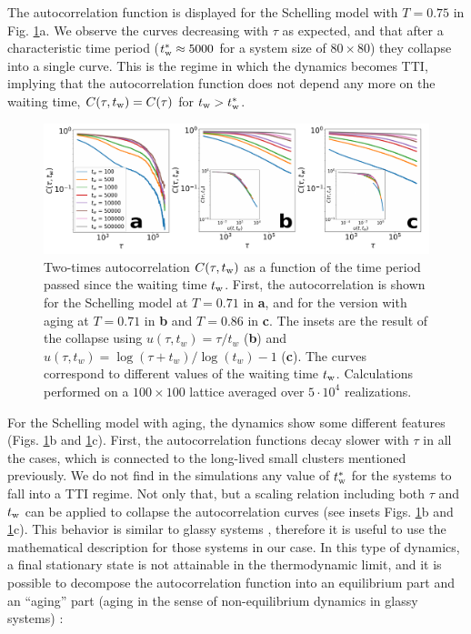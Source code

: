 The autocorrelation function is displayed for the Schelling model with $T = 0.75$ in Fig. \ref{Fig5}a. We observe the curves decreasing with $\tau$ as expected, and that after a characteristic time period ($t_{\rm{w}}^* \approx 5000$ for a system size of $80\times 80$) they collapse into a single curve. This is the regime in which the dynamics becomes TTI, implying that the autocorrelation function does not depend any more on the waiting time, $C(\tau,t_{\rm{w}}) = C(\tau)$ for $ t_{\rm{w}} > t_{\rm{w}}^{*}$. 

\begin{figure}
\centering \captionsetup{font=sf}
\includegraphics[width=\linewidth]{Figs/Aging_Schelling/fig5new.pdf} 
\caption[Two-times autocorrelation]{Two-times autocorrelation $C (\tau,t_{\rm{w}})$ as a function of the time period passed since the waiting time $t_{\rm{w}}$. First, the autocorrelation is shown for the Schelling model at $T = 0.71$ in \textbf{a}, and for the version with aging at $T = 0.71$ in \textbf{b} and $T = 0.86$ in \textbf{c}. The insets are the result of the collapse using $u(\tau,t_w) = \tau/t_w$ (\textbf{b}) and $u(\tau,t_w) = \log(\tau+t_w)/\log(t_w) - 1$ (\textbf{c}). The curves correspond to different values of the waiting time $t_{\rm{w}}$. Calculations performed on a $100 \times 100$ lattice averaged over $5 \cdot 10^{4}$ realizations.}
\label{Fig5}
\end{figure}

For the Schelling model with aging, the dynamics show some different features (Figs. \ref{Fig5}b and \ref{Fig5}c). First, the autocorrelation functions decay slower with $\tau$ in all the cases, which is connected to the long-lived small clusters mentioned previously. We do not find in the simulations any value of $t_{\rm{w}}^*$ for the systems to fall into a TTI regime. Not only that, but a scaling relation including both $\tau$ and $t_{\rm{w}}$ can be applied to collapse the autocorrelation curves (see insets Figs. \ref{Fig5}b and \ref{Fig5}c). This behavior is similar to glassy systems \cite{spinglassbook}, therefore it is useful to use the mathematical description for those systems in our case. In this type of dynamics, a final stationary state is not attainable in the thermodynamic limit, and it is possible to decompose the autocorrelation function into an equilibrium part and an ``aging'' part (aging in the sense of non-equilibrium dynamics in glassy systems)  \cite{spinglassbook,Heisemberg}:

